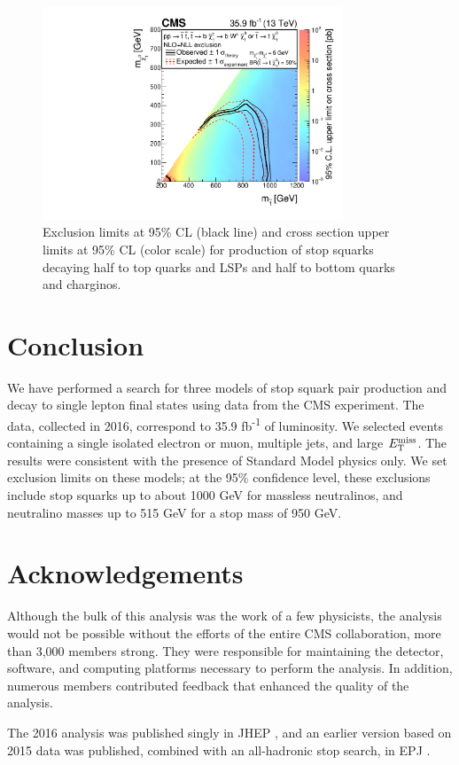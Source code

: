 \begin{figure}[htbp]
\centering
\includegraphics[width=0.8\textwidth]{figures/limits_T2tb.pdf}
\caption{Exclusion limits at 95\% CL (black line) and cross section
  upper limits at 95\% CL (color scale) for production of stop squarks
  decaying half to top quarks and LSPs and half to bottom quarks and
  charginos.}
\label{fig:stop:limits:t2tb}
\end{figure}


\section{Conclusion}
\label{sec:stop:conclusion}

We have performed a search for three models of stop squark pair production
and decay to single lepton final states using data from the CMS
experiment. The data, collected in 2016, correspond to 35.9
fb\textsuperscript{-1} of luminosity. We selected events containing a
single isolated electron or muon, multiple jets, and large
$E_\text{T}^\text{miss}$. The results were consistent with the presence of Standard
Model physics only. We set exclusion
limits on these models; at the 95\% confidence level, these exclusions
include stop squarks up to about 1000 GeV for massless neutralinos,
and neutralino masses up to 515 GeV for a stop mass of 950 GeV.

\section{Acknowledgements}
\label{sec:stop:acknowledgements}

Although the bulk of this analysis was the work of a few physicists,
the analysis would not be possible without the efforts of the entire
CMS collaboration, more than 3,000 members strong. They were responsible
for maintaining the detector, software, and computing platforms
necessary to perform the analysis. In addition, numerous members
contributed feedback that enhanced the quality of the analysis.

The 2016 analysis was published singly in JHEP \cite{stop1l}, and an
earlier version based on 2015 data was published, combined with an
all-hadronic stop search, in EPJ \cite{combination0l}.
